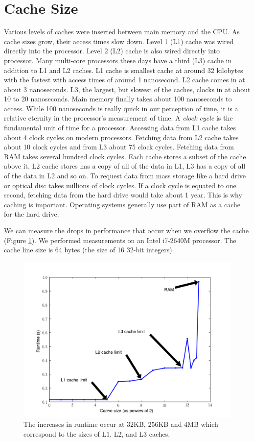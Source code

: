 \section*{Cache Size}
Various levels of caches were inserted between main memory and the CPU.  
As cache sizes grow, their access times slow down.
Level 1 (L1) cache was wired directly into the processor.  Level 2 (L2) cache is also wired directly into processor.  
Many multi-core processors these days have a third (L3) cache in addition to L1 and L2 caches.  
L1 cache is smallest cache at around 32 kilobytes with the fastest with access times of around 1 nanosecond.  
L2 cache comes in at about 3 nanoseconds.  L3, the largest, but slowest of the caches, clocks in at about 10 to 20 nanoseconds. 
Main memory finally takes about 100 nanoseconds to access.  While 100 nanoseconds is really quick in our perception of time, it is a relative eternity in the processor's measurement of time.  A \emph{clock cycle} is the fundamental unit of time for a processor.  
Accessing data from L1 cache takes about 4 clock cycles on modern processors.  Fetching data from L2 cache takes about 10 clock cycles and from L3 about 75 clock cycles.  
Fetching data from RAM takes several hundred clock cycles.
Each cache stores a subset of the cache above it.  L2 cache stores has a copy of all of the data in L1, L3 has a copy of all of the data in L2 and so on.
To request data from mass storage like a hard drive or optical disc takes millions of clock cycles.
If a clock cycle is equated to one second, fetching data from the hard drive would take about 1 year.
This is why caching is important.  Operating systems generally use part of RAM as a cache for the hard drive.

We can measure the drops in performance that occur when we overflow the cache (Figure \ref{fig:cachesizes}).
We performed measurements on an Intel i7-2640M processor.  The cache line size is 64 bytes (the size of 16 32-bit integers).
\begin{figure}[h]
\centering
\includegraphics[width=\textwidth]{cache_size.pdf}
\caption{The increases in runtime occur at 32KB, 256KB and 4MB which correspond to the sizes of L1, L2, and L3 caches.}
\label{fig:cachesizes}
\end{figure}

